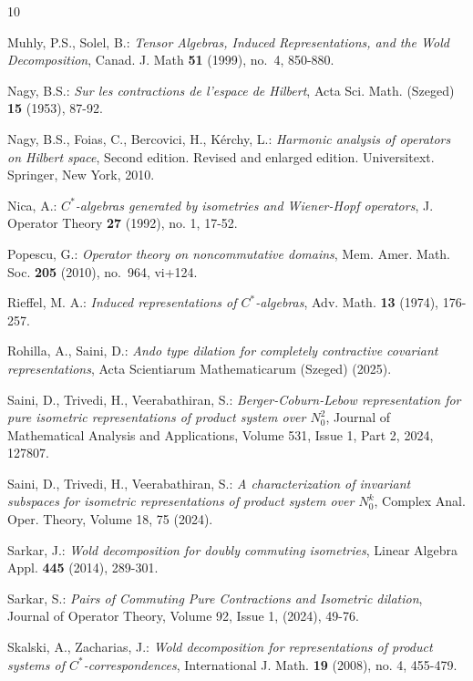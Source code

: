 \documentclass[12pt]{amsart}
\numberwithin{equation}{section}
\theoremstyle{plain}
\begin{document}
\begin{thebibliography}{10}
		
		Muhly, P.S., Solel, B.: \emph{Tensor Algebras, {I}nduced Representations,
			and the {W}old Decomposition}, Canad. J. Math \textbf{51} (1999), no.~4, 850-880.
		
	Nagy, B.S.: \emph{Sur les contractions de l’espace de Hilbert}, Acta Sci. Math. (Szeged) \textbf{15} (1953), 87-92.
		
	Nagy, B.S.,  Foias, C.,  Bercovici, H.,  Kérchy, L.: \emph{Harmonic analysis of operators on Hilbert space}, Second edition. Revised and enlarged edition. Universitext. Springer, New York, 2010.
		
		Nica, A.: \emph{$C^*$-algebras generated by isometries and Wiener-Hopf operators},
		J. Operator Theory \textbf{27} (1992), no. 1, 17-52.
	
		Popescu, G.: \emph{Operator theory on noncommutative domains}, Mem. Amer. Math.
		Soc. \textbf{205} (2010), no.~964, vi+124.
	
	     Rieffel, M. A.: \emph{Induced representations of $C^{*}$-algebras}, Adv. Math. \textbf{{13}} (1974), 176-257.
	    
	    Rohilla, A., Saini, D.: \emph{Ando type dilation for completely contractive covariant representations}, Acta Scientiarum Mathematicarum (Szeged) (2025).
		
	Saini, D., Trivedi, H., Veerabathiran, S.: \emph{Berger-Coburn-Lebow representation for pure isometric representations of product system over $N_0^2$}, Journal of Mathematical Analysis and Applications, Volume 531, Issue 1, Part 2, 2024, 127807.
		
	Saini, D., Trivedi, H., Veerabathiran, S.: \emph{A characterization of invariant subspaces for isometric representations of product system over $N_0^k$}, Complex Anal. Oper. Theory, Volume 18, 75 (2024).
		
		Sarkar, J.: \emph{Wold decomposition for doubly commuting isometries},
		Linear Algebra Appl. \textbf{445} (2014), 289-301.
	
		
		Sarkar, S.: \emph{Pairs of Commuting Pure Contractions and Isometric dilation}, Journal of Operator Theory, Volume 92, Issue 1, (2024), 49-76.
		
		
		Skalski, A., Zacharias, J.: \emph{Wold decomposition for representations of product systems of $C^*$-correspondences},
		International J. Math. \textbf{19} (2008), no. 4, 455-479.
	

\end{thebibliography}
\end{document}
